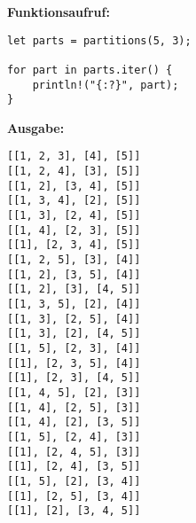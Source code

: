 \documentclass[a4paper]{scrartcl}
\begin{document}
\textbf{Funktionsaufruf:}
\begin{lstlisting}
let parts = partitions(5, 3);

for part in parts.iter() {
    println!("{:?}", part);    
}
\end{lstlisting}

\textbf{Ausgabe:}
\begin{lstlisting}
[[1, 2, 3], [4], [5]]
[[1, 2, 4], [3], [5]]
[[1, 2], [3, 4], [5]]
[[1, 3, 4], [2], [5]]
[[1, 3], [2, 4], [5]]
[[1, 4], [2, 3], [5]]
[[1], [2, 3, 4], [5]]
[[1, 2, 5], [3], [4]]
[[1, 2], [3, 5], [4]]
[[1, 2], [3], [4, 5]]
[[1, 3, 5], [2], [4]]
[[1, 3], [2, 5], [4]]
[[1, 3], [2], [4, 5]]
[[1, 5], [2, 3], [4]]
[[1], [2, 3, 5], [4]]
[[1], [2, 3], [4, 5]]
[[1, 4, 5], [2], [3]]
[[1, 4], [2, 5], [3]]
[[1, 4], [2], [3, 5]]
[[1, 5], [2, 4], [3]]
[[1], [2, 4, 5], [3]]
[[1], [2, 4], [3, 5]]
[[1, 5], [2], [3, 4]]
[[1], [2, 5], [3, 4]]
[[1], [2], [3, 4, 5]]
\end{lstlisting}
\end{document}

